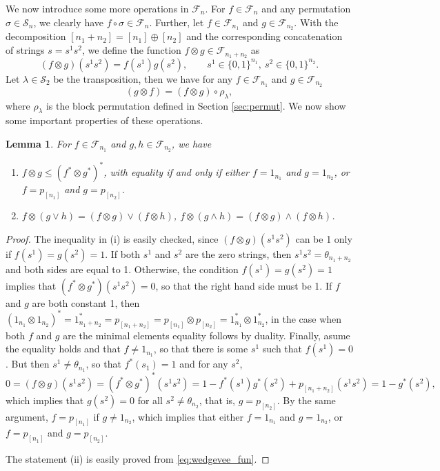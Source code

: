 \documentclass[12pt]{article}
\newtheorem{lemma}{Lemma}
\theoremstyle{definition}
\theoremstyle{remark}
\def\Fe{\mathcal F}
\def\permut{\mathscr{S}}
\begin{document}
We now introduce some more operations in $\Fe_n$. For $f\in \Fe_n$ and any permutation
$\sigma\in \permut_n$, we clearly have $f\circ \sigma\in \Fe_n$.
Further, let $f\in \Fe_{n_1}$ and $g\in \Fe_{n_2}$. With the decomposition
$[n_1+n_2]=[n_1]\oplus [n_2]$
and the corresponding concatenation of strings $s=s^1s^2$,  we define
the function $f\otimes g\in \Fe_{n_1+n_2}$ as
\[
(f\otimes g)(s^1s^2)=f(s^1)g(s^2),\qquad s^1\in \{0,1\}^{n_1},\ s^2\in \{0,1\}^{n_2}.
\]
Let $\lambda\in \permut_2$ be the transposition, then we have for any $f\in \Fe_{n_1}$ and
$g\in \Fe_{n_2}$
\[
(g\otimes f)=(f\otimes g)\circ \rho_\lambda,
\]
where $\rho_\lambda$ is the block permutation defined in  Section \ref{sec:permut}.
We now show some important properties of these operations.

\begin{lemma}\label{lemma:fproduct} For $f\in \Fe_{n_1}$ and  $g,h\in \Fe_{n_2}$, we have
\begin{enumerate}
\item[(i)] $f\otimes g\le (f^*\otimes g^*)^*$, with equality if and only if either
$f=1_{n_1}$ and $g=1_{n_2}$, or $f=p_{[n_1]}$ and $g=p_{[n_2]}$.
\item[(ii)] $f\otimes (g\vee h)= (f\otimes g)\vee (f\otimes h)$, $f\otimes (g\wedge h)=
(f\otimes g)\wedge (f\otimes h)$.
\end{enumerate}

\end{lemma}

\begin{proof} The inequality in (i) is easily  checked, since $(f\otimes g)(s^1s^2)$ can be 1 only if
$f(s^1)=g(s^2)=1$. If both $s^1$ and $s^2$ are the zero strings, then $s^1s^2=\theta_{n_1+n_2}$ and both sides
are equal to 1. Otherwise, the condition $f(s^1)=g(s^2)=1$ implies that $(f^*\otimes
g^*)(s^1s^2)=0$, so that the right hand side must be 1. If $f$ and $g$ are both
constant 1, then $(1_{n_1}\otimes 1_{n_2})^*=1_{n_1+n_2}^*=p_{[n_1+n_2]}=p_{[n_1]}\otimes
p_{[n_2]}=1_{n_1}^*\otimes
1_{n_2}^*$, in the case when both $f$
and $g$ are the minimal elements equality  follows by
duality. Finally, asume the equality holds and that $f\ne 1_{n_1}$, so that there is some $s^1$ such that 
$f(s^1)=0$. But then $s^1\ne \theta_{n_1}$, so that $f^*(s_1)=1$  and for any $s^2$,
\[
0=(f\otimes g)(s^1s^2)=(f^*\otimes
g^*)^*(s^1s^2)=1-f^*(s^1)g^*(s^2)+p_{[n_1+n_2]}(s^1s^2)=1-g^*(s^2),
\]
which implies that $g(s^2)=0$ for all $s^2\ne\theta_{n_2}$, that is, $g=p_{[n_2]}$. By the same argument,
$f=p_{[n_1]}$ if $g\ne 1_{n_2}$, which implies that either $f=1_{n_1}$ and $g=1_{n_2}$, or
$f=p_{[n_1]}$ and $g=p_{[n_2]}$.

The statement (ii) is easily proved from \eqref{eq:wedgevee_fun}.

\end{proof}
\end{document}
